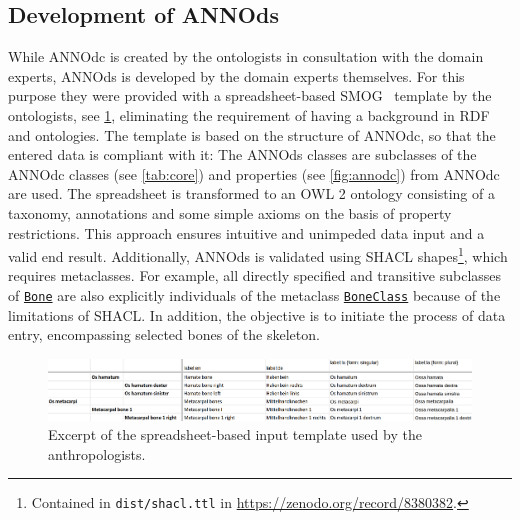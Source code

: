 \documentclass[sw]{iosart2x}
\newcommand{\anno}[1]{\href{https://annosaxfdm.de/ontology/#1}{\texttt{#1}}}
\begin{document}
\subsection{Development of ANNOds}\label{sec:annods}
While ANNOdc is created by the ontologists in consultation with the domain experts, ANNOds is developed by the domain experts themselves.
For this purpose they were provided with a spreadsheet-based SMOG~\citep{smog} template by the ontologists, see \cref{fig:smog}, eliminating the requirement of having a background in RDF and ontologies.
The template is based on the structure of ANNOdc, so that the entered data is compliant with it: The ANNOds classes are subclasses of the ANNOdc classes (see \cref{tab:core}) and properties (see \cref{fig:annodc}) from ANNOdc are used.
The spreadsheet is transformed to an OWL 2 ontology consisting of a taxonomy, annotations and some simple axioms on the basis of property restrictions.
This approach ensures intuitive and unimpeded data input and a valid end result.
Additionally, ANNOds is validated using SHACL shapes\footnote{Contained in \texttt{dist/shacl.ttl} in \url{https://zenodo.org/record/8380382}.}, which requires metaclasses.
For example, all directly specified and transitive subclasses of \anno{Bone} are also explicitly individuals of the metaclass \anno{BoneClass} because of the limitations of SHACL.
In addition, the objective is to initiate the process of data entry, encompassing selected bones of the skeleton.

\begin{figure}[ht]
\includegraphics[width=\textwidth]{img/smog.png}
\caption{Excerpt of the spreadsheet-based input template used by the anthropologists.}\label{fig:smog}
\end{figure}
\end{document}
